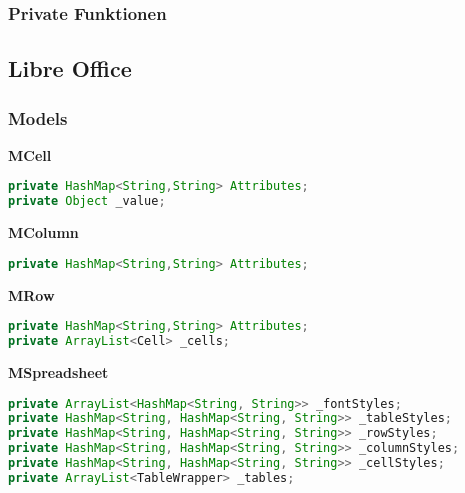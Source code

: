 \subsubsection{Private Funktionen}
\label{subsubsectionMySqlPrivateFunctions}

\subsection{Libre Office}
\label{subsectionLibreOffice}

\subsubsection{Models}
\label{subsubsectionLibreOfficeModels}

\textbf{MCell}

\begin{lstlisting}[label={labelMySqlConnectionParameters},caption=Repräsentation einer Zelle einer Libre Office Calc Datei, language=Java]
private HashMap<String,String> Attributes;
private Object _value;
\end{lstlisting}

\textbf{MColumn}

\begin{lstlisting}[label={labelMySqlConnectionParameters},caption=Repräsentation einer Spalte einer Libre Office Calc Datei, language=Java]
private HashMap<String,String> Attributes;
\end{lstlisting}

\textbf{MRow}

\begin{lstlisting}[label={labelMySqlConnectionParameters},caption=Repräsentation einer Zeile einer Libre Office Calc Datei, language=Java]
private HashMap<String,String> Attributes;
private ArrayList<Cell> _cells;
\end{lstlisting}

\textbf{MSpreadsheet}

\begin{lstlisting}[label={labelMySqlConnectionParameters},caption=Repräsentation einer kompletten Libre Office Calc Datei, language=Java]
private ArrayList<HashMap<String, String>> _fontStyles;
private HashMap<String, HashMap<String, String>> _tableStyles;
private HashMap<String, HashMap<String, String>> _rowStyles;
private HashMap<String, HashMap<String, String>> _columnStyles;
private HashMap<String, HashMap<String, String>> _cellStyles;
private ArrayList<TableWrapper> _tables;
\end{lstlisting}

